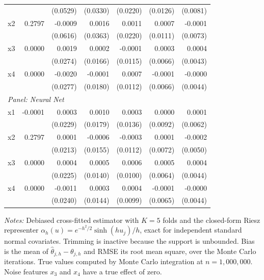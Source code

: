 \begin{table}[htbp]
\begin{threeparttable}
\begin{tabular}{lrrrrrr}
 &  & (0.0529) & (0.0330) & (0.0220) & (0.0126) & (0.0081) \\
\quad x2 & 0.2797 & -0.0009 & 0.0016 & 0.0011 & 0.0007 & -0.0001 \\
 &  & (0.0616) & (0.0363) & (0.0220) & (0.0111) & (0.0073) \\
\quad x3 & 0.0000 & 0.0019 & 0.0002 & -0.0001 & 0.0003 & 0.0004 \\
 &  & (0.0274) & (0.0166) & (0.0115) & (0.0066) & (0.0043) \\
\quad x4 & 0.0000 & -0.0020 & -0.0001 & 0.0007 & -0.0001 & -0.0000 \\
 &  & (0.0277) & (0.0180) & (0.0112) & (0.0066) & (0.0044) \\
\midrule
\multicolumn{7}{l}{\textit{Panel: Neural Net}} \\
\quad x1 & -0.0001 & 0.0003 & 0.0010 & 0.0003 & 0.0000 & 0.0001 \\
 &  & (0.0229) & (0.0179) & (0.0136) & (0.0092) & (0.0062) \\
\quad x2 & 0.2797 & 0.0001 & -0.0006 & -0.0003 & 0.0001 & -0.0002 \\
 &  & (0.0213) & (0.0155) & (0.0112) & (0.0072) & (0.0050) \\
\quad x3 & 0.0000 & 0.0004 & 0.0005 & 0.0006 & 0.0005 & 0.0004 \\
 &  & (0.0225) & (0.0140) & (0.0100) & (0.0064) & (0.0044) \\
\quad x4 & 0.0000 & -0.0011 & 0.0003 & 0.0004 & -0.0001 & -0.0000 \\
 &  & (0.0240) & (0.0144) & (0.0099) & (0.0065) & (0.0044) \\
\bottomrule
\end{tabular}
\begin{tablenotes}
\footnotesize
\item \textit{Notes:} Debiased cross-fitted estimator with $K=5$ folds and the closed-form Riesz representer $\alpha_h(u) = e^{-h^2/2}\sinh(h u_j)/h$, exact for independent standard normal covariates. Trimming is inactive because the support is unbounded. Bias is the mean of $\hat{\theta}_{j,h} - \theta_{j,h}$ and RMSE its root mean square, over the Monte Carlo iterations. True values computed by Monte Carlo integration at $n=1{,}000{,}000$. Noise features $x_3$ and $x_4$ have a true effect of zero.
\end{tablenotes}
\end{threeparttable}
\end{table}